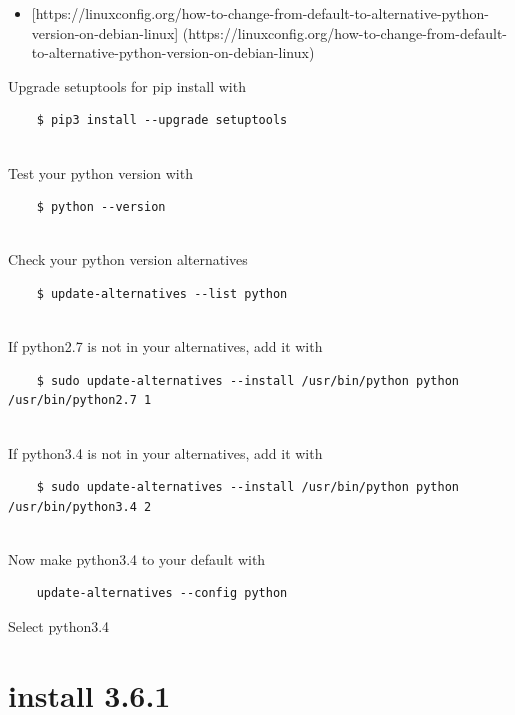 \begin{itemize}

\item
  {[}https://linuxconfig.org/how-to-change-from-default-to-alternative-python-version-on-debian-linux{]}
  (https://linuxconfig.org/how-to-change-from-default-to-alternative-python-version-on-debian-linux)
\end{itemize}

Upgrade setuptools for pip install with

\begin{verbatim}
    $ pip3 install --upgrade setuptools
    
\end{verbatim}

Test your python version with

\begin{verbatim}
    $ python --version
    
\end{verbatim}

Check your python version alternatives

\begin{verbatim}
    $ update-alternatives --list python
    
\end{verbatim}

If python2.7 is not in your alternatives, add it with

\begin{verbatim}
    $ sudo update-alternatives --install /usr/bin/python python /usr/bin/python2.7 1
    
\end{verbatim}

If python3.4 is not in your alternatives, add it with

\begin{verbatim}
    $ sudo update-alternatives --install /usr/bin/python python /usr/bin/python3.4 2
    
\end{verbatim}

Now make python3.4 to your default with

\begin{verbatim}
    update-alternatives --config python
\end{verbatim}

Select python3.4

\section{install 3.6.1}\label{install-3.6.1}


